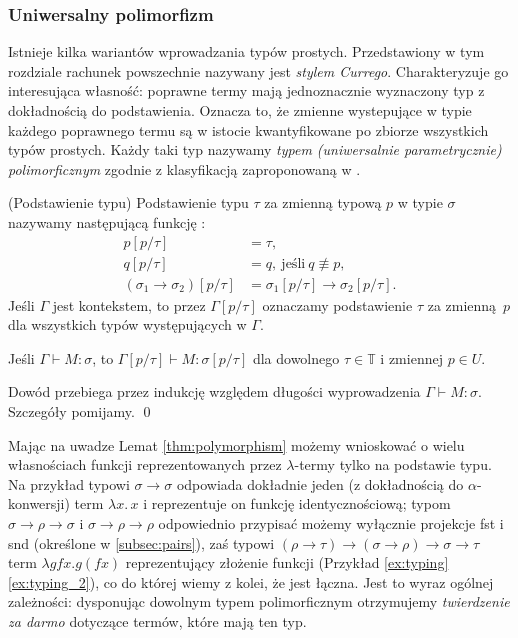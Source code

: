\subsubsection{Uniwersalny polimorfizm}\label{subsec:polymorphism}
Istnieje kilka wariantów wprowadzania typów prostych. Przedstawiony w tym rozdziale rachunek powszechnie nazywany jest \emph{stylem Currego}. Charakteryzuje go interesująca własność: poprawne termy mają jednoznacznie wyznaczony typ z dokładnością do podstawienia. Oznacza to, że zmienne wystepujące w typie każdego poprawnego termu są w istocie kwantyfikowane po zbiorze wszystkich typów prostych. Każdy taki typ nazywamy \emph{typem (uniwersalnie parametrycznie) polimorficznym} zgodnie z klasyfikacją zaproponowaną w \cite{Cardelli1985}.

\begin{definicja}(Podstawienie typu)
Podstawienie typu \(\tau\) za zmienną typową \(p\) w typie \(\sigma\) nazywamy następującą funkcję :
\begin{align*}
  p[p/ \tau] &=\tau,\\
  q[p/ \tau] &=q,\ \text{jeśli}\ q\not\equiv p,\\
  (\sigma_1 \to \sigma_2) [p/\tau] &= \sigma_1 [p/\tau] \to \sigma_2 [p/\tau].
\end{align*}
  Jeśli \(\Gamma\) jest kontekstem, to przez \(\Gamma[p/\tau]\) oznaczamy podstawienie \(\tau\) za zmienną \(p\) dla wszystkich typów występujących w \(\Gamma\).
\end{definicja}

\begin{lemat}\label{thm:polymorphism}
  Jeśli \(\Gamma\vdash M:\sigma\), to \(\Gamma [p/\tau]\vdash M:\sigma[p/\tau]\) dla dowolnego \(\tau\in\mathbb{T}\) i zmiennej \(p\in U\).
\end{lemat}
\begin{dowod}
  Dowód przebiega przez indukcję względem długości wyprowadzenia \(\Gamma\vdash M:\sigma\). Szczegóły pomijamy. \qed
\end{dowod}

Mając na uwadze Lemat \ref{thm:polymorphism} możemy wnioskować o wielu własnościach funkcji reprezentowanych przez \(\lambda\)-termy tylko na podstawie typu. Na przykład typowi \(\sigma\to\sigma\) odpowiada dokładnie jeden (z dokładnością do \(\alpha\)-konwersji) term \(\lambda x.\,x\) i reprezentuje on funkcję identycznościową; typom \(\sigma\to\rho\to\sigma\) i \(\sigma\to\rho\to\rho\) odpowiednio przypisać możemy wyłącznie projekcje fst i snd (określone w \ref{subsec:pairs}), zaś typowi \((\rho\to\tau) \to (\sigma\to\rho)\to\sigma\to\tau\) term \(\lambda g f x. g (f x)\) reprezentujący złożenie funkcji (Przykład \ref{ex:typing} \ref{ex:typing_2}), co do której wiemy z kolei, że jest łączna.
Jest to wyraz ogólnej zależności: dysponując dowolnym typem polimorficznym otrzymujemy \emph{twierdzenie za darmo} \cite{Wadler1989} dotyczące termów, które mają ten typ. 


